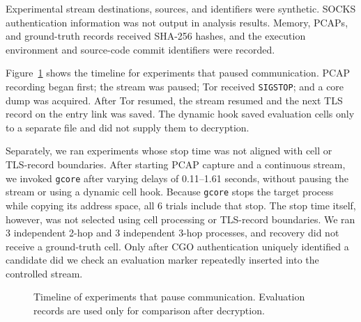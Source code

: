 \documentclass[10pt,a4paper]{article}
\newcommand{\code}[1]{\nolinkurl{#1}}
\begin{document}
Experimental stream destinations, sources, and identifiers were synthetic. SOCKS authentication information was not output in analysis results. Memory, PCAPs, and ground-truth records received SHA-256 hashes, and the execution environment and source-code commit identifiers were recorded.

Figure~\ref{fig:acquisition-timeline} shows the timeline for experiments that paused communication. PCAP recording began first; the stream was paused; Tor received \code{SIGSTOP}; and a core dump was acquired. After Tor resumed, the stream resumed and the next TLS record on the entry link was saved. The dynamic hook saved evaluation cells only to a separate file and did not supply them to decryption.

Separately, we ran experiments whose stop time was not aligned with cell or TLS-record boundaries. After starting PCAP capture and a continuous stream, we invoked \code{gcore} after varying delays of 0.11--1.61 seconds, without pausing the stream or using a dynamic cell hook. Because \code{gcore} stops the target process while copying its address space, all 6 trials include that stop. The stop time itself, however, was not selected using cell processing or TLS-record boundaries. We ran 3 independent 2-hop and 3 independent 3-hop processes, and recovery did not receive a ground-truth cell. Only after CGO authentication uniquely identified a candidate did we check an evaluation marker repeatedly inserted into the controlled stream.

\begin{figure}[!tbp]
\centering
{}
\caption{Timeline of experiments that pause communication. Evaluation records are used only for comparison after decryption.}
\label{fig:acquisition-timeline}
\end{figure}
\end{document}
